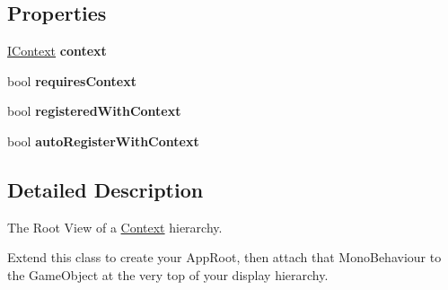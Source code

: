 \subsection*{Properties}
\begin{DoxyCompactItemize}
\item 
\hypertarget{classstrange_1_1extensions_1_1context_1_1impl_1_1_context_view_ae5bb756aecf7d6e310642b43f2a2af6c}{\hyperlink{interfacestrange_1_1extensions_1_1context_1_1api_1_1_i_context}{I\-Context} {\bfseries context}}\label{classstrange_1_1extensions_1_1context_1_1impl_1_1_context_view_ae5bb756aecf7d6e310642b43f2a2af6c}

\item 
\hypertarget{classstrange_1_1extensions_1_1context_1_1impl_1_1_context_view_abcc664ec512c7e284ccd2fe8b3a647e5}{bool {\bfseries requires\-Context}}\label{classstrange_1_1extensions_1_1context_1_1impl_1_1_context_view_abcc664ec512c7e284ccd2fe8b3a647e5}

\item 
\hypertarget{classstrange_1_1extensions_1_1context_1_1impl_1_1_context_view_af5a8dbb476fa3e534a3002314e792094}{bool {\bfseries registered\-With\-Context}}\label{classstrange_1_1extensions_1_1context_1_1impl_1_1_context_view_af5a8dbb476fa3e534a3002314e792094}

\item 
\hypertarget{classstrange_1_1extensions_1_1context_1_1impl_1_1_context_view_acd70b48d1957f0463f0e367653f4c7ce}{bool {\bfseries auto\-Register\-With\-Context}}\label{classstrange_1_1extensions_1_1context_1_1impl_1_1_context_view_acd70b48d1957f0463f0e367653f4c7ce}

\end{DoxyCompactItemize}


\subsection{Detailed Description}
The Root View of a \hyperlink{classstrange_1_1extensions_1_1context_1_1impl_1_1_context}{Context} hierarchy. 

Extend this class to create your App\-Root, then attach that Mono\-Behaviour to the Game\-Object at the very top of your display hierarchy.

